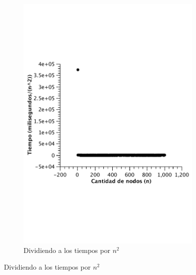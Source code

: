 \begin{figure}[H]
        \begin{subfigure}[b]{0.5\textwidth}
                \includegraphics[width=\textwidth]{imagenes/completo-listas-3.pdf}
                \caption{Dividiendo a los tiempos por $n^2$}
        \end{subfigure}


\end{figure}
